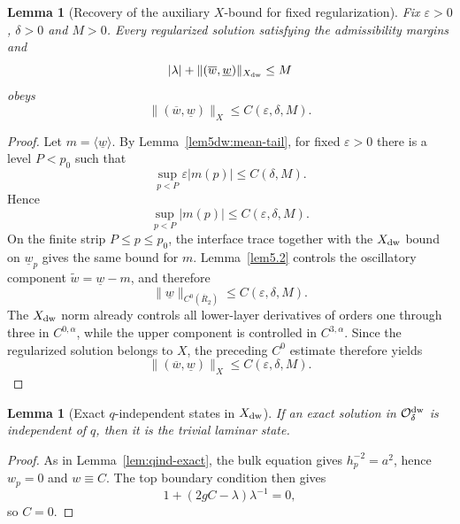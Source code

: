 \documentclass[11pt,reqno]{amsart}
\numberwithin{equation}{section}
\newtheorem{lemma}[theorem]{Lemma}
\theoremstyle{definition}
\theoremstyle{remark}
\begin{document}
\begin{lemma}[Recovery of the auxiliary $X$-bound for fixed regularization]
\label{lem5dw:fixed-eps-X}
Fix $\varepsilon>0$, $\delta>0$ and $M>0$.  Every regularized solution
satisfying the admissibility margins and
\[
 |\lambda|+\|(\overline w,\underline w)\|_{X_{\rm dw}}\le M
\]
obeys
\[
 \|(\overline w,\underline w)\|_X\le C(\varepsilon,\delta,M).
\]
\end{lemma}
\begin{proof}
Let $m=\langle\underline w\rangle$.  By
Lemma~\ref{lem5dw:mean-tail}, for fixed $\varepsilon>0$ there is a
level $P<p_0$ such that
\[
 \sup_{p<P}\varepsilon |m(p)|\le C(\delta,M).
\]
Hence
\[
 \sup_{p<P}|m(p)|\le C(\varepsilon,\delta,M).
\]
On the finite strip $P\le p\le p_0$, the interface trace together
with the $X_{\rm dw}$ bound on $\underline w_p$ gives the same bound
for $m$.  Lemma~\ref{lem5.2} controls the oscillatory component
$\widetilde w=\underline w-m$, and therefore
\[
 \|\underline w\|_{C^0(\overline R_2)}
 \le C(\varepsilon,\delta,M).
\]
The $X_{\rm dw}$ norm already controls all lower-layer derivatives of
orders one through three in $C^{0,\alpha}$, while the upper component
is controlled in $C^{3,\alpha}$.  Since the regularized solution
belongs to $X$, the preceding $C^0$ estimate therefore yields
\[
 \|(\overline w,\underline w)\|_X
 \le C(\varepsilon,\delta,M).
\]
\end{proof}

\begin{lemma}[Exact $q$-independent states in $X_{\rm dw}$]
\label{lem5dw:qind-exact}
If an exact solution in $\mathcal O_\delta^{\rm dw}$ is independent of
$q$, then it is the trivial laminar state.
\end{lemma}
\begin{proof}
As in Lemma~\ref{lem:qind-exact}, the bulk equation gives
$h_p^{-2}=a^2$, hence $w_p=0$ and $w\equiv C$.  The top boundary
condition then gives
\[
 1+(2gC-\lambda)\lambda^{-1}=0,
\]
so $C=0$.
\end{proof}
\end{document}
